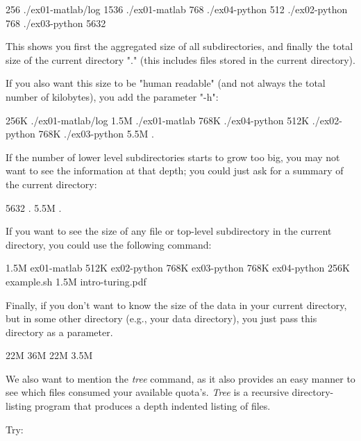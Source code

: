 \begin{prompt}
256 ./ex01-matlab/log
1536 ./ex01-matlab
768 ./ex04-python
512 ./ex02-python
768 ./ex03-python
5632
\end{prompt}

This shows you first the aggregated size of all subdirectories, and finally the
total size of the current directory "." (this includes files stored in the
current directory).

If you also want this size to be "human readable" (and not always the total
number of kilobytes), you add the parameter "-h":

\begin{prompt}
256K ./ex01-matlab/log
1.5M ./ex01-matlab
768K ./ex04-python
512K ./ex02-python
768K ./ex03-python
5.5M .
\end{prompt}

If the number of lower level subdirectories starts to grow too big, you may not
want to see the information at that depth; you could just ask for a summary of
the current directory:

\begin{prompt}
5632 .
5.5M .
\end{prompt}

If you want to see the size of any file or top-level subdirectory in the
current directory, you could use the following command:

\begin{prompt}
1.5M ex01-matlab
512K ex02-python
768K ex03-python
768K ex04-python
256K example.sh
1.5M intro-turing.pdf
\end{prompt}


Finally, if you don't want to know the size of the data in your current
directory, but in some other directory (e.g., your data directory), you just
pass this directory as a parameter.

\begin{prompt}
22M %
36M %
22M %
3.5M %
\end{prompt}

We also want to mention the \emph{tree} command, as it also provides an easy
manner to see which files consumed your available quota's. \emph{Tree} is a
recursive directory-listing program that produces a depth indented listing of
files.

Try:

\begin{prompt}
\end{prompt}
